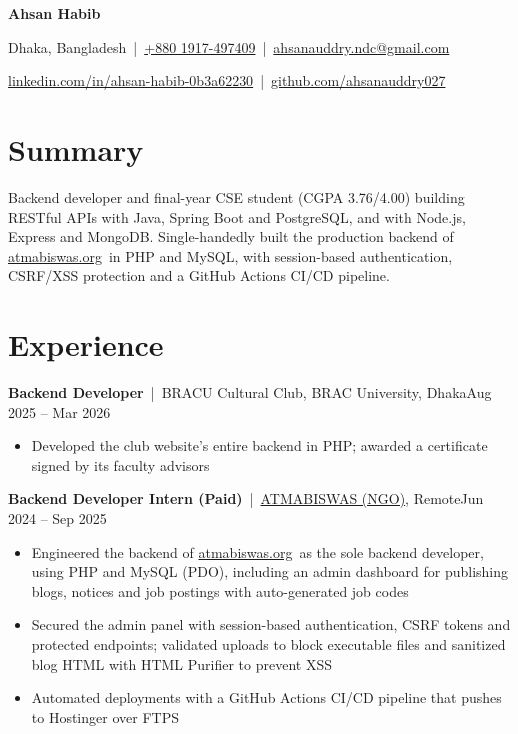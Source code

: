 \documentclass[10pt]{article}
\providecommand{\pdffakespace}{}                        %
\newcommand{\ssp}{\pdffakespace\ }                      %
\newcommand{\sep}{\ssp\textcolor{muted}{|}\ssp}                         %
\newcommand{\entry}[3]{\textbf{#1}\sep #2\pdffakespace\hfill\textcolor{muted}{#3}\par} %
\newcommand{\gap}{\vspace{3.5pt}}
\begin{document}
\begin{center}
{\fontsize{21}{25}\selectfont\bfseries Ahsan Habib}\par\vspace{4pt}
{\small Dhaka, Bangladesh\sep\href{tel:+8801917497409}{+880 1917-497409}\sep\href{mailto:ahsanauddry.ndc@gmail.com}{ahsanauddry.ndc@gmail.com}}\par\vspace{1pt}
{\small\href{https://www.linkedin.com/in/ahsan-habib-0b3a62230}{linkedin.com/in/ahsan-habib-0b3a62230}\sep\href{https://github.com/ahsanauddry027}{github.com/ahsanauddry027}}
\end{center}
\vspace{-6pt}

\section{Summary}
Backend developer and final-year CSE student (CGPA 3.76/4.00) building RESTful APIs with Java, Spring Boot and PostgreSQL, and with Node.js, Express and MongoDB. Single-handedly built the production backend of \href{https://atmabiswas.org}{atmabiswas.org}\ssp in PHP and MySQL, with session-based authentication, CSRF/XSS protection and a GitHub Actions CI/CD pipeline.

\section{Experience}
\entry{Backend Developer}{BRACU Cultural Club, BRAC University, Dhaka}{Aug 2025 -- Mar 2026}
\begin{itemize}
  \item Developed the club website's entire backend in PHP; awarded a certificate signed by its faculty advisors
\end{itemize}
\gap
\entry{Backend Developer Intern (Paid)}{\href{https://atmabiswas.org}{ATMABISWAS (NGO)}, Remote}{Jun 2024 -- Sep 2025}
\begin{itemize}
  \item Engineered the backend of \href{https://atmabiswas.org}{atmabiswas.org}\ssp as the sole backend developer, using PHP and MySQL (PDO), including an admin dashboard for publishing blogs, notices and job postings with auto-generated job codes
  \item Secured the admin panel with session-based authentication, CSRF tokens and protected endpoints; validated uploads to block executable files and sanitized blog HTML with HTML Purifier to prevent XSS
  \item Automated deployments with a GitHub Actions CI/CD pipeline that pushes to Hostinger over FTPS
\end{itemize}
\end{document}
